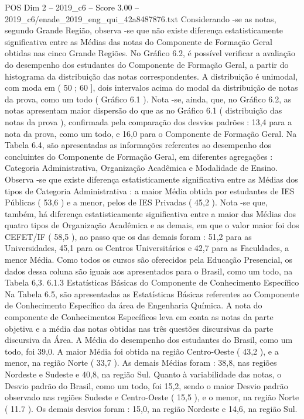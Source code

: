 \begin{textsample}{POS Dim 2 – 2019\_c6 – Score 3.00 – 2019\_c6/enade\_2019\_eng\_qui\_42a8487876.txt}
Considerando -se as notas, segundo Grande Região, observa -se que não existe diferença estatisticamente significativa entre as Médias das notas do Componente de Formação Geral obtidas nas cinco Grande Regiões.
No Gráfico 6.2, é possível verificar a avaliação do desempenho dos estudantes do Componente de Formação Geral, a partir do histograma da distribuição das notas correspondentes.
A distribuição é unimodal, com moda em ( 50 ; 60 ], dois intervalos acima do modal da distribuição de notas da prova, como um todo ( Gráfico 6.1 ).
Nota -se, ainda, que, no Gráfico 6.2, as notas apresentam maior dispersão do que as no Gráfico 6.1 ( distribuição das notas da prova ), confirmada pela comparação dos desvios padrões : 13,4 para a nota da prova, como um todo, e 16,0 para o Componente de Formação Geral.
Na Tabela 6.4, são apresentadas as informações referentes ao desempenho dos concluintes do Componente de Formação Geral, em diferentes agregações : Categoria Administrativa, Organização Acadêmica e Modalidade de Ensino.
Observa -se que existe diferença estatisticamente significativa entre as Médias dos tipos de Categoria Administrativa : a maior Média obtida por estudantes de IES Públicas ( 53,6 ) e a menor, pelos de IES Privadas ( 45,2 ).
Nota -se que, também, há diferença estatisticamente significativa entre a maior das Médias dos quatro tipos de Organização Acadêmica e as demais, em que o valor maior foi dos CEFET/IF ( 58,5 ), ao passo que os das demais foram : 51,2 para as Universidades, 45,1 para os Centros Universitários e 42,7 para as Faculdades, a menor Média.
Como todos os cursos são oferecidos pela Educação Presencial, os dados dessa coluna são iguais aos apresentados para o Brasil, como um todo, na Tabela 6,3. 6.1.3 Estatísticas Básicas do Componente de Conhecimento Específico Na Tabela 6.5, são apresentadas as Estatísticas Básicas referentes ao Componente de Conhecimento Específico da área de Engenharia Química.
A nota do componente de Conhecimentos Específicos leva em conta as notas da parte objetiva e a média das notas obtidas nas três questões discursivas da parte discursiva da Área.
A Média do desempenho dos estudantes do Brasil, como um todo, foi 39,0.
A maior Média foi obtida na região Centro-Oeste ( 43,2 ), e a menor, na região Norte ( 33,7 ).
As demais Médias foram : 38,8, nas regiões Nordeste e Sudeste e 40,8, na região Sul.
Quanto à variabilidade das notas, o Desvio padrão do Brasil, como um todo, foi 15,2, sendo o maior Desvio padrão observado nas regiões Sudeste e Centro-Oeste ( 15,5 ), e o menor, na região Norte ( 11.7 ).
Os demais desvios foram : 15,0, na região Nordeste e 14,6, na região Sul.

\end{textsample}
